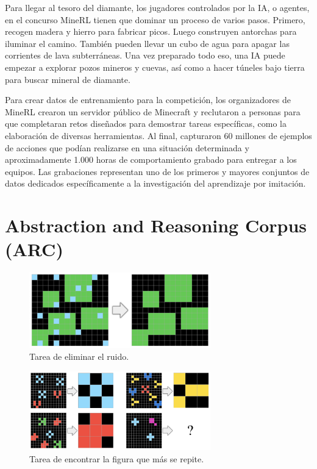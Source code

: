 Para llegar al tesoro del diamante, los jugadores controlados por la IA, o agentes, en el concurso MineRL tienen que dominar un proceso de varios pasos. Primero, recogen madera y hierro para fabricar picos. Luego construyen antorchas para iluminar el camino. También pueden llevar un cubo de agua para apagar las corrientes de lava subterráneas. Una vez preparado todo eso, una IA puede empezar a explorar pozos mineros y cuevas, así como a hacer túneles bajo tierra para buscar mineral de diamante.

Para crear datos de entrenamiento para la competición, los organizadores de MineRL crearon un servidor público de Minecraft y reclutaron a personas para que completaran retos diseñados para demostrar tareas específicas, como la elaboración de diversas herramientas. Al final, capturaron 60 millones de ejemplos de acciones que podían realizarse en una situación determinada y aproximadamente 1.000 horas de comportamiento grabado para entregar a los equipos. Las grabaciones representan uno de los primeros y mayores conjuntos de datos dedicados específicamente a la investigación del aprendizaje por imitación.

\section{Abstraction and Reasoning Corpus (ARC)}\label{section:state-of-the-art:arc}

\begin{figure}[ht!]
    \centering
    \includegraphics[width=0.7\textwidth]{Graphics/arc-2.png}
    \caption{Tarea de eliminar el ruido.}
    \label{fig:arc-1}
\end{figure}

\begin{figure}[ht!]
    \centering
    \includegraphics[width=0.7\textwidth]{Graphics/arc-1.png}
    \caption{Tarea de encontrar la figura que más se repite.}
    \label{fig:arc-2}
\end{figure}

